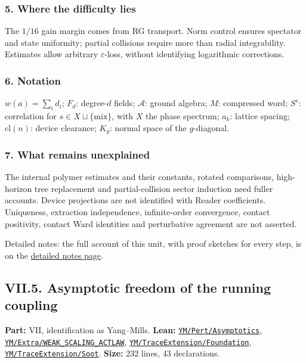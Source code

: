 \documentclass[
  letterpaper,
  11pt]{article}
\begin{document}
\subsubsection{5. Where the difficulty
lies}\label{where-the-difficulty-lies-28}

The \(1/16\) gain margin comes from RG transport. Norm control ensures
spectator and state uniformity; partial collisions require more than
radial integrability. Estimates allow arbitrary \(\varepsilon\)-loss,
without identifying logarithmic corrections.

\subsubsection{6. Notation}\label{notation-28}

\(w(a)=\sum_i d_i\); \(F_d\): degree-\(d\) fields; \(\mathcal A\):
ground algebra; \(M\): compressed word; \(S^s\): correlation for
\(s\in X\sqcup\{\mathrm{mix}\}\), with \(X\) the phase spectrum;
\(a_k\): lattice spacing; \(\mathrm{cl}(n)\): device clearance; \(K_g\):
normal space of the \(g\)-diagonal.

\subsubsection{7. What remains
unexplained}\label{what-remains-unexplained-28}

The internal polymer estimates and their constants, rotated comparisons,
high-horizon tree replacement and partial-collision sector induction
need fuller accounts. Device projections are not identified with Reader
coefficients. Uniqueness, extraction independence, infinite-order
convergence, contact positivity, contact Ward identities and
perturbative agreement are not asserted.

Detailed notes: the full account of this unit, with proof sketches for
every step, is on the
\href{https://github.com/scottnarmstrong/yang-mills-informalization/blob/main/outline/notes/VII-4.md}{detailed
notes page}.

\subsection{VII.5. Asymptotic freedom of the running
coupling}\label{vii.5.-asymptotic-freedom-of-the-running-coupling}

\textbf{Part:} VII, identification as Yang--Mills. \textbf{Lean:}
\href{https://github.com/yang-mills-group/OpenAI-YM-20261028/tree/3456e5e75cf8d4cd558955a5c7638fba2d68f464/YM/Pert/Asymptotics}{\texttt{YM/Pert/Asymptotics}},
\href{https://github.com/yang-mills-group/OpenAI-YM-20261028/tree/3456e5e75cf8d4cd558955a5c7638fba2d68f464/YM/Extra/WEAK_SCALING_ACTLAW}{\texttt{YM/Extra/WEAK\_SCALING\_ACTLAW}},
\href{https://github.com/yang-mills-group/OpenAI-YM-20261028/tree/3456e5e75cf8d4cd558955a5c7638fba2d68f464/YM/TraceExtension/Foundation}{\texttt{YM/TraceExtension/Foundation}},
\href{https://github.com/yang-mills-group/OpenAI-YM-20261028/tree/3456e5e75cf8d4cd558955a5c7638fba2d68f464/YM/TraceExtension/Soot}{\texttt{YM/TraceExtension/Soot}}.
\textbf{Size:} 232 lines, 43 declarations.
\end{document}
